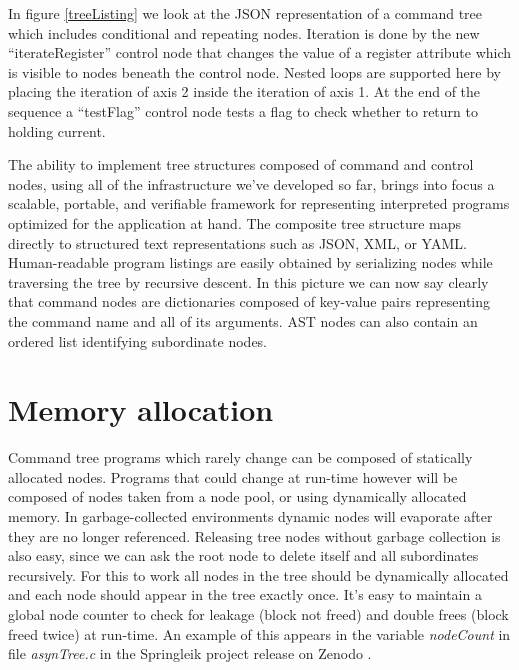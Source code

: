 \documentclass[a4paper,10pt]{article}
\begin{document}
In figure \ref{treeListing} we look at the JSON representation of a command tree which includes conditional and repeating nodes. Iteration is done by the new ``iterateRegister'' control node that changes the value of a register attribute which is visible to nodes beneath the control node. Nested loops are supported here by placing the iteration of axis 2 inside the iteration of axis 1. At the end of the sequence a ``testFlag'' control node tests a flag to check whether to return to holding current.

The ability to implement tree structures composed of command and control nodes, using all of the infrastructure we've developed so far, brings into focus a scalable, portable, and verifiable framework for representing interpreted programs optimized for the application at hand. The composite tree structure maps directly to structured text representations such as JSON, XML, or YAML. Human-readable program listings are easily obtained by serializing nodes while traversing the tree by recursive descent. In this picture we can now say clearly that command nodes are dictionaries composed of key-value pairs representing the command name and all of its arguments. AST nodes can also contain an ordered list identifying subordinate nodes.

\section{Memory allocation}

Command tree programs which rarely change can be composed of statically allocated nodes. Programs that could change at run-time however will be composed of nodes taken from a node pool, or using dynamically allocated memory. In garbage-collected environments dynamic nodes will evaporate after they are no longer referenced. Releasing tree nodes without garbage collection is also easy, since we can ask the root node to delete itself and all subordinates recursively. For this to work all nodes in the tree should be dynamically allocated and each node should appear in the tree exactly once. It's easy to maintain a global node counter to check for leakage (block not freed) and double frees (block freed twice) at run-time. An example of this appears in the variable \textit{nodeCount} in file \textit{asynTree.c} in the Springleik project release on Zenodo \cite{ZenodoC-Lang}.
\end{document}
